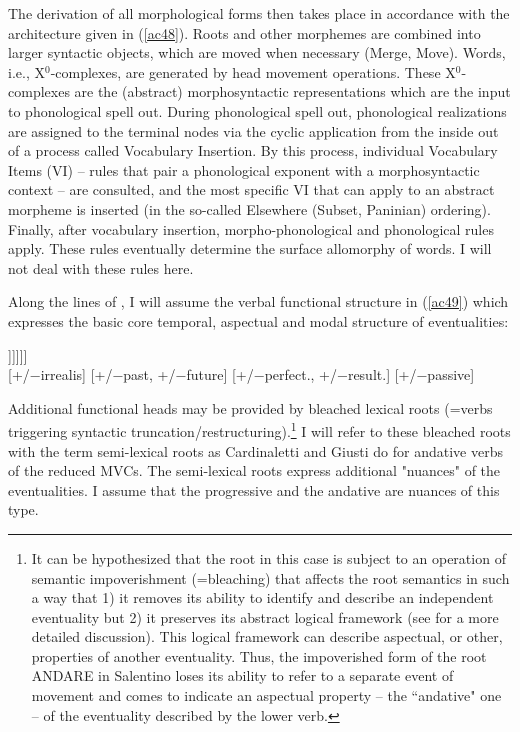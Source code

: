 \documentclass[output=paper]{langscibook}
\begin{document}
The derivation of all morphological forms then takes place in accordance with the architecture given in (\ref{ac48}). Roots and other morphemes are combined into larger syntactic objects, which are moved when necessary (Merge, Move). Words, i.e., X$^0$-complexes, are generated by head movement operations. These X$^0$-complexes are the (abstract) morphosyntactic representations which are the input to phonological spell out.  During phonological spell out, phonological realizations are assigned to the terminal nodes via the cyclic application from the inside out of a process called Vocabulary Insertion. By this process, individual Vocabulary Items (VI)  --  rules that pair a phonological exponent with a morphosyntactic context -- are consulted, and the most specific VI that can apply to an abstract morpheme is inserted (in the so-called Elsewhere (Subset, Paninian) ordering).  Finally, after vocabulary insertion, morpho-phonological and phonological rules apply.  These rules eventually determine the surface allomorphy of words.  I will not deal with these rules here.

Along the lines of \cite{wurmbrand2015}, I will assume the verbal functional structure in (\ref{ac49}) which expresses the basic core temporal, aspectual and modal structure of eventualities:

\ea \label{ac49}
\gll [\textsubscript{MoodP} Mood$^0$ [\textsubscript{TenseP} T$^0$ [\textsubscript{AspP} Asp$^0$ [\textsubscript{VoiceP} Voice$^0$ [\textsubscript{vP} v$^0$ [\textsubscript{√p} √Root$^0$ ]]]]]]\\
     {} [+/−irrealis] {} {[+/−past, +/−future]} {}  {[+/−perfect., +/−result.]} {} [+/−passive] {} {} {} {} {}\\
\z

Additional functional heads may be provided by bleached lexical roots (=verbs triggering syntactic truncation/restructuring).\footnote{It can be hypothesized that the root in this case is subject to an operation of semantic impoverishment (=bleaching) that affects the root semantics in such a way that 1) it removes its ability to identify and describe an independent eventuality but 2) it preserves its abstract logical framework (see \cite{roberts2010a} for a more detailed discussion).  This logical framework can describe aspectual, or other, properties of another eventuality.  Thus, the impoverished form of the root ANDARE in Salentino loses its ability to refer to a separate event of movement and comes to indicate an aspectual property -- the “andative" one -- of the eventuality described by the lower verb.}  I will refer to these bleached roots with the term semi-lexical roots as Cardinaletti and Giusti do for andative verbs of the reduced MVCs. The semi-lexical roots express additional "nuances" of the eventualities.   I assume that the progressive and the andative are nuances of this type.
\end{document}

